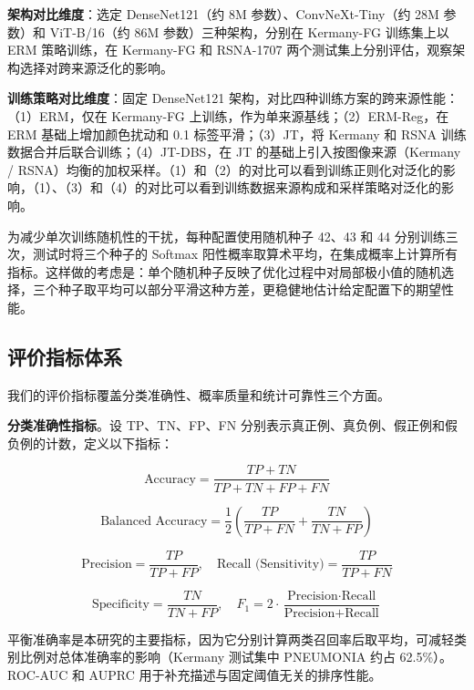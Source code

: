 \documentclass[12pt,a4paper,UTF8,openany]{ctexbook}
\begin{document}
\textbf{架构对比维度}：选定 DenseNet121（约 8M 参数）、ConvNeXt-Tiny（约 28M 参数）和 ViT-B/16（约 86M 参数）三种架构，分别在 Kermany-FG 训练集上以 ERM 策略训练，在 Kermany-FG 和 RSNA-1707 两个测试集上分别评估，观察架构选择对跨来源泛化的影响。

\textbf{训练策略对比维度}：固定 DenseNet121 架构，对比四种训练方案的跨来源性能：（1）ERM，仅在 Kermany-FG 上训练，作为单来源基线；（2）ERM-Reg，在 ERM 基础上增加颜色扰动和 0.1 标签平滑；（3）JT，将 Kermany 和 RSNA 训练数据合并后联合训练；（4）JT-DBS，在 JT 的基础上引入按图像来源（Kermany / RSNA）均衡的加权采样。（1）和（2）的对比可以看到训练正则化对泛化的影响，（1）、（3）和（4）的对比可以看到训练数据来源构成和采样策略对泛化的影响。

为减少单次训练随机性的干扰，每种配置使用随机种子 42、43 和 44 分别训练三次，测试时将三个种子的 Softmax 阳性概率取算术平均，在集成概率上计算所有指标。这样做的考虑是：单个随机种子反映了优化过程中对局部极小值的随机选择，三个种子取平均可以部分平滑这种方差，更稳健地估计给定配置下的期望性能。

\subsection{评价指标体系}

我们的评价指标覆盖分类准确性、概率质量和统计可靠性三个方面。

\textbf{分类准确性指标}。设 TP、TN、FP、FN 分别表示真正例、真负例、假正例和假负例的计数，定义以下指标：

\begin{equation}
\text{Accuracy} = \frac{TP + TN}{TP + TN + FP + FN}
\end{equation}

\begin{equation}
\text{Balanced Accuracy} = \frac{1}{2}\left(\frac{TP}{TP + FN} + \frac{TN}{TN + FP}\right)
\end{equation}

\begin{equation}
\text{Precision} = \frac{TP}{TP + FP}, \quad
\text{Recall (Sensitivity)} = \frac{TP}{TP + FN}
\end{equation}

\begin{equation}
\text{Specificity} = \frac{TN}{TN + FP}, \quad
F_1 = 2\cdot\frac{\text{Precision} \cdot \text{Recall}}{\text{Precision} + \text{Recall}}
\end{equation}

平衡准确率是本研究的主要指标，因为它分别计算两类召回率后取平均，可减轻类别比例对总体准确率的影响（Kermany 测试集中 PNEUMONIA 约占 62.5\%）。ROC-AUC 和 AUPRC 用于补充描述与固定阈值无关的排序性能。
\end{document}
